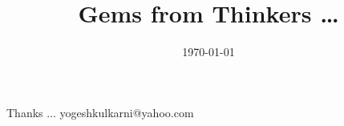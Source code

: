 \documentclass[xcolor=dvipsnames,compress,t,pdf]{beamer}
\title[\hspace{4cm} \insertframenumber /\inserttotalframenumber]
{Gems from Thinkers \ldots}
\date[2020]{\today}
\begin{document}
\begin{frame}
\titlepage
\end{frame}





\begin{frame}[c]{}
Thanks ...
\vspace{5mm}
yogeshkulkarni@yahoo.com
\end{frame}
\end{document}

